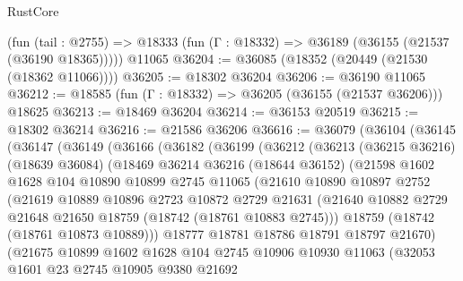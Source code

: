 \begin{lexlean}{RustCore}
\begin{coremodule}
    (fun (tail : @2755) => @18333 (fun (Γ : @18332) => @36189 (@36155 (@21537 (@36190 @18365)))))
    @11065
@36204 := @36085 (@18352 (@20449 (@21530 (@18362 @11066))))
@36205 := @18302 @36204
@36206 := @36190 @11065
@36212 := @18585 (fun (Γ : @18332) => @36205 (@36155 (@21537 @36206))) @18625
@36213 := @18469 @36204
@36214 := @36153 @20519
@36215 := @18302 @36214
@36216 := @21586 @36206
@36616 := @36079
    (@36104
      (@36145
        (@36147
          (@36149
            (@36166
              (@36182
                (@36199
                  (@36212
                    (@36213
                      (@36215 @36216)
                      (@18639 @36084)
                      (@18469
                        @36214
                        @36216
                        (@18644 @36152)
                        (@21598
                          @1602
                          @1628
                          @104
                          @10890
                          @10899
                          @2745
                          @11065
                          (@21610
                            @10890
                            @10897
                            @2752
                            (@21619
                              @10889
                              @10896
                              @2723
                              @10872
                              @2729
                              @21631
                              (@21640
                                @10882
                                @2729
                                @21648
                                @21650
                                @18759
                                (@18742 (@18761 @10883 @2745)))
                              @18759
                              (@18742 (@18761 @10873 @10889)))
                            @18777
                            @18781
                            @18786
                            @18791
                            @18797
                            @21670)
                          (@21675
                            @10899
                            @1602
                            @1628
                            @104
                            @2745
                            @10906
                            @10930
                            @11063
                            (@32053
                              @1601
                              @23
                              @2745
                              @10905
                              @9380
                              @21692

\end{coremodule}
\end{lexlean}
